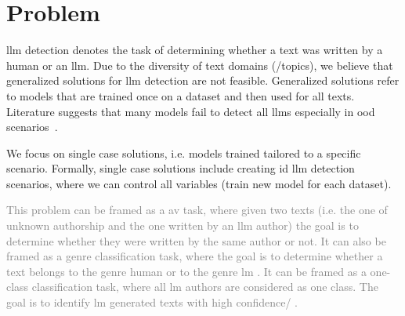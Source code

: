 \section{Problem}
\label{sec:problem}

\ac{llm} detection denotes the task of determining whether a text was written by a human or an \ac{llm}.
Due to the diversity of text domains (/topics), we believe that generalized solutions for \ac{llm} detection are not feasible.
Generalized solutions refer to models that are trained once on a dataset and then used for all texts.
Literature suggests that many models fail to detect all \acp{llm} especially in \ac{ood} scenarios~\citep{bhattacharjee_fighting_2024,li_learning_2025}.

We focus on single case solutions, i.e. models trained tailored to a specific scenario.
Formally, single case solutions include creating \ac{id} \ac{llm} detection scenarios, 
where we can control all variables (train new model for each dataset).

\textcolor{gray}{
This problem can be framed as a \ac{av} task, where given two texts 
(i.e. the one of unknown authorship and the one written by an \ac{llm} author) 
the goal is to determine whether they were written by the same author or not.
It can also be framed as a genre classification task, where the goal is to determine whether a text belongs 
to the genre human or to the genre \ac{lm} .
It can be framed as a one-class classification task, where all \ac{lm} authors are considered as one class.
The goal is to identify \ac{lm} generated texts with high confidence/ .
}

